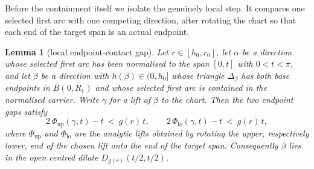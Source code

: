 \documentclass[11pt]{article}
\theoremstyle{plain}
\newtheorem{lemma}[theorem]{Lemma}
\theoremstyle{definition}
\theoremstyle{remark}
\begin{document}
Before the containment itself we isolate the genuinely local step. It compares
one selected first arc with one competing direction, after rotating the chart so
that each end of the target span is an actual endpoint.

\begin{lemma}[local endpoint-contact gap]\label{lem:localcontact}
Let $r\in[h_{0},r_{0}]$, let $\alpha$ be a direction whose selected first arc has
been normalised to the span $[0,t]$ with $0<t<\pi$, and let $\beta$ be a
direction with $h(\beta)\in(0,h_{0}]$ whose triangle $\Delta_{\beta}$ has both
base endpoints in $\overline B(0,R_{1})$ and whose selected first arc is
contained in the normalised carrier. Write $\gamma$ for a lift of $\beta$ to the
chart. Then the two endpoint gaps satisfy
\[
  2\,\Phi_{\mathrm{up}}(\gamma,t)-t\ <\ g(r)\,t,
  \qquad
  2\,\Phi_{\mathrm{lo}}(\gamma,t)-t\ <\ g(r)\,t,
\]
where $\Phi_{\mathrm{up}}$ and $\Phi_{\mathrm{lo}}$ are the analytic lifts
obtained by rotating the upper, respectively lower, end of the chosen lift onto
the end of the target span. Consequently $\beta$ lies in the open centred
dilate $D_{g(r)}(t/2,t/2)$.
\end{lemma}
\end{document}
